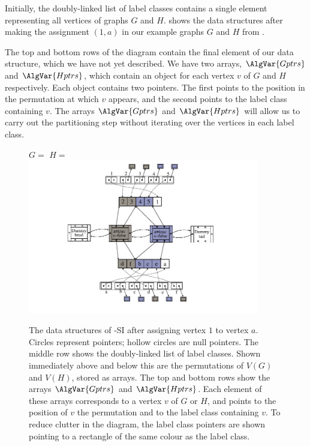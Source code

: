 \FloatBarrier

Initially, the doubly-linked list of label classes contains a single element representing
all vertices of graphs $G$ and $H$.   shows the data structures
after making the assignment $(1,a)$ in our example graphs $G$ and $H$ from .

The top and bottom rows of the diagram contain the final element of our data structure, which we
have not yet described.  We have two arrays, $\AlgVar{Gptrs}$ and $\AlgVar{Hptrs}$, which contain
an object for each vertex $v$ of $G$ and $H$ respectively.  Each object contains two pointers.
The first points to the position in the permutation at which $v$ appears, and the second points
to the label class containing $v$.  The arrays $\AlgVar{Gptrs}$ and $\AlgVar{Hptrs}$ will allow
us to carry out the partitioning step without iterating over the vertices in each label class.

\begin{figure}[h!]
    \centering
    $G=$
    \qquad\qquad
    $H=$
    \includegraphics*[width=0.9\textwidth]{14b-mcsplit-induced-si/figs/data-structure-step-1}
    \caption{The data structures of \McSplit-SI after assigning vertex $1$ to vertex $a$.
        Circles represent pointers; hollow circles are null pointers.  The middle row shows
        the doubly-linked list of label classes.  Shown immediately above and below this are the
        permutations of $V(G)$ and $V(H)$, stored as arrays.  The top and bottom rows
        show the arrays $\AlgVar{Gptrs}$ and $\AlgVar{Hptrs}$.  Each element of these arrays
        corresponds to a vertex $v$ of $G$ or $H$, and points to the position of $v$
        the permutation and to the label class containing $v$.  To reduce clutter in the diagram,
        the label class pointers are shown pointing to a rectangle of the same colour as the
        label class.}
    \label{figure:si-data-structures}
\end{figure}

